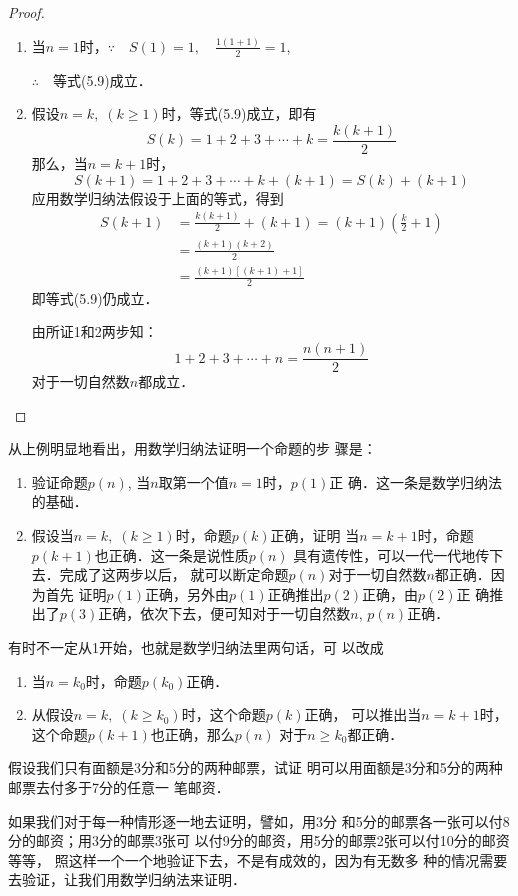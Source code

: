 \begin{proof}
    \begin{enumerate}
        \item 当$n=1$时，$\because\quad S(1)=1,\quad \frac{1(1+1)}{2}=1$,
        
        $\therefore\quad $等式(5.9)成立．

        \item 假设$n=k,\; (k\ge 1)$时，等式(5.9)成立，即有
\[S(k)=1+2+3+\cdots+k=\frac{k(k+1)}{2}\]
那么，当$n=k+1$时，
\[S(k+1)=1+2+3+\cdots+k+(k+1)=S(k)+(k+1)\]
应用数学归纳法假设于上面的等式，得到
\[\begin{split}
    S(k+1)&=\frac{k(k+1)}{2}+(k+1)=(k+1)\left(\frac{k}{2}+1\right)\\
    &=\frac{(k+1)(k+2)}{2}\\
    &=\frac{(k+1)[(k+1)+1]}{2}
\end{split}\]
即等式(5.9)仍成立．

由所证1和2两步知：
\[1+2+3+\cdots+n=\frac{n(n+1)}{2}\]
对于一切自然数$n$都成立．
\end{enumerate}
\end{proof}

从上例明显地看出，用数学归纳法证明一个命题的步
骤是：
\begin{enumerate}
\item 验证命题$p(n)$, 当$n$取第一个值$n=1$时，$p(1)$正
确．这一条是数学归纳法的基础．
\item 假设当$n=k,\; (k\ge 1)$时，命题$p(k)$正确，证明
当$n=k+1$时，命题$p(k+1)$也正确．这一条是说性质$p(n)$
具有遗传性，可以一代一代地传下去．完成了这两步以后，
就可以断定命题$p(n)$对于一切自然数$n$都正确．因为首先
证明$p(1)$正确，另外由$p(1)$正确推出$p(2)$正确，由$p(2)$正
确推出了$p(3)$正确，依次下去，便可知对于一切自然数$n$,
$p(n)$正确．
\end{enumerate}


有时不一定从1开始，也就是数学归纳法里两句话，可
以改成
\begin{enumerate}
    \item 当$n=k_0$时，命题$p(k_0)$正确．
    \item 从假设$n=k,\; (k\ge k_0)$时，这个命题$p(k)$正确，
    可以推出当$n=k+1$时，这个命题$p(k+1)$也正确，那么$p(n)$
    对于$n\ge k_0$都正确．
\end{enumerate}

\begin{example}
    假设我们只有面额是3分和5分的两种邮票，试证
明可以用面额是3分和5分的两种邮票去付多于7分的任意一
笔邮资．

如果我们对于每一种情形逐一地去证明，譬如，用3分
和5分的邮票各一张可以付8分的邮资；用3分的邮票3张可
以付9分的邮资，用5分的邮票2张可以付10分的邮资等等，
照这样一个一个地验证下去，不是有成效的，因为有无数多
种的情况需要去验证，让我们用数学归纳法来证明．
\end{example}

